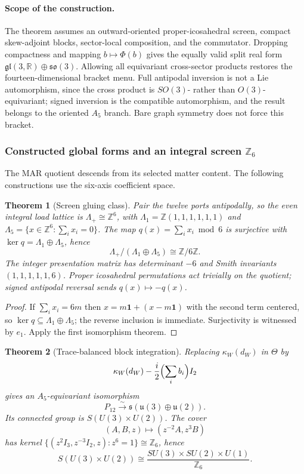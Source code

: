 \documentclass[11pt]{article}
\newtheorem{theorem}{Theorem}[section]
\begin{document}
\paragraph{Scope of the construction.} The theorem assumes an outward-oriented
proper-icosahedral screen, compact skew-adjoint blocks, sector-local composition,
and the commutator.
Dropping compactness and mapping \(b\mapsto\Phi(b)\) gives the equally valid
split real form \(\mathfrak{gl}(3,\mathbb R)\oplus\mathfrak{so}(3)\). Allowing all
equivariant cross-sector products restores the fourteen-dimensional bracket
menu. Full antipodal inversion is not a Lie automorphism, since the cross product
is \(SO(3)\)- rather than \(O(3)\)-equivariant; signed inversion is the
compatible automorphism, and the result belongs to the oriented \(A_5\) branch.
Bare graph symmetry does not force this bracket.

\subsubsection*{Constructed global forms and an integral screen
\texorpdfstring{$\mathbb Z_6$}{Z6}}

The MAR quotient descends from its selected matter content. The following
constructions use the six-axis coefficient space.

\begin{theorem}[Screen gluing class]
Pair the twelve ports antipodally, so the even integral load lattice is
\(\Lambda_+\cong\mathbb Z^6\), with
\(\Lambda_1=\mathbb Z(1,1,1,1,1,1)\) and
\(\Lambda_5=\{x\in\mathbb Z^6:\sum_ix_i=0\}\). The map
\(q(x)=\sum_ix_i \bmod 6\) is surjective with \(\ker q=\Lambda_1\oplus\Lambda_5\),
hence
\[
  \Lambda_+/(\Lambda_1\oplus\Lambda_5)\cong\mathbb Z/6\mathbb Z .
\]
The integer presentation matrix has determinant \(-6\) and Smith invariants
\((1,1,1,1,1,6)\). Proper icosahedral permutations act trivially on the
quotient; signed antipodal reversal sends \(q(x)\mapsto-q(x)\).
\end{theorem}

\begin{proof}
If \(\sum_ix_i=6m\) then \(x=m\mathbf1+(x-m\mathbf1)\) with the second term
centered, so \(\ker q\subseteq\Lambda_1\oplus\Lambda_5\); the reverse inclusion
is immediate. Surjectivity is witnessed by \(e_1\). Apply the first isomorphism
theorem.
\end{proof}

\begin{theorem}[Trace-balanced block integration]
Replacing \(\kappa_W(d_W)\) in \(\Theta\) by
\[
 \kappa_W(d_W)-\frac i2\Bigl(\sum_i b_i\Bigr)I_2
\]
gives an \(A_5\)-equivariant isomorphism
\[
 P_{12}\xrightarrow{\sim}
 \mathfrak{s}(\mathfrak u(3)\oplus\mathfrak u(2)).
\]
Its connected group is \(S(U(3)\times U(2))\). The cover
\[
 (A,B,z)\longmapsto(z^{-2}A,z^3B)
\]
has kernel
\(\{(z^2I_3,z^{-3}I_2,z):z^6=1\}\cong\mathbb Z_6\), hence
\[
 S(U(3)\times U(2))\cong
 \frac{SU(3)\times SU(2)\times U(1)}{\mathbb Z_6}.
\]
\end{theorem}
\end{document}
